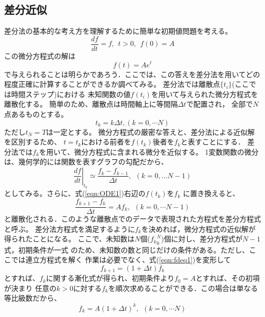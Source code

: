 \documentclass[10pt,a4j,dvipdfmx]{jarticle}
\begin{document}
\subsection{差分近似}
差分法の基本的な考え方を理解するために簡単な初期値問題を考える。
\begin{equation}
	\frac{d f}{d t} =f, \ \ t>0, \ \ f(0)=A
	\label{eqn:ODE1}
\end{equation}
この微分方程式の解は
\begin{equation}
	f(t)=Ae^{t}
\end{equation}
で与えられることは明らかであろう．ここでは、この答えを差分法を用いてどの
程度正確に計算することができるか調べてみる。
差分法では離散点$\{t_i\}$(ここでは時間ステップ)における
未知関数の値$f(t_i)$を用いて与えられた微分方程式を離散化する。
簡単のため、離散点は時間軸上に等間隔$\Delta t$で配置され，
全部で$N$点あるものとする。
\begin{equation}
	t_k=k\Delta t,(k=0,\cdots N)
	\label{eqn:}
\end{equation}
ただし$t_N=T$は一定とする。
微分方程式の厳密な答えと、差分法による近似解を区別するため、
$t=t_k$における前者を$f(t_k)$後者を$f_k$と表すことにする．
差分法では$f_k$を用いて、微分方程式に含まれる微分を近似する。
1変数関数の微分は、幾何学的には関数を表すグラフの勾配だから、
\begin{equation}
	\left. \frac{df}{dt} \right|_{t_k} \simeq 
	\frac{f_k-f_{k-1}}{\Delta t}, \ \ (k=0,\dots N-1)
	\label{eqn:fd_1st}
\end{equation}
としてみる。さらに、式(\ref{eqn:ODE1})右辺の$f(t_k)$を$f_k$
に置き換えると、
\begin{equation}
	\frac{f_{k+1}-f_k}{\Delta t} = A f_k, \ \ (k=0,\cdots N-1)
	\label{eqn:fdeq1}
\end{equation}
と離散化される．このような離散点でのデータで表現された方程式を差分方程式と呼ぶ。
差分法方程式を満足するように$f_k$を決めれば，微分方程式の近似解が得られたことになる。
ここで、未知数は$N$個(${f_k}_0^N$)個に対し、差分方程式が$N-1$式，初期条件が一式
のため、未知数の数と同じだけの条件がある。ただし、ここでは連立方程式を解く
作業は必要でなく、式(\ref{eqn:fdeq1})を変形して
\begin{equation}
	f_{k+1}=(1+\Delta t) f_k
	\label{eqn:}
\end{equation}
とすれば、$f_{k}$に関する漸化式が得られ、初期条件より$f_0=A$とすれば、その初項が決まり
任意の$k>0$に対する$f_k$を順次求めることができる．この場合は単なる等比級数だから、
\begin{equation}
	f_k=A(1+\Delta t)^k, \ \ (k=0,\cdots N)
	\label{eqn:}
\end{equation}
\end{document}
